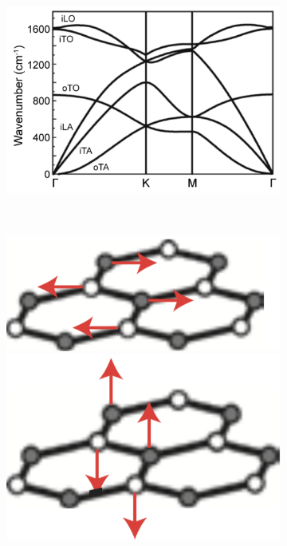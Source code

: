 \begin{figure}[!h]
  \centering
  \begin{subfigure}[t]{0.7\textwidth}
    \caption{}
    \includegraphics[width=\textwidth]{./images/phonon-modes.png}
  \end{subfigure}
  ~
  \begin{subfigure}[t]{0.25\textwidth}
    \centering
    \caption{}
    \includegraphics[width=\textwidth]{./images/g-mode-phonon.png}
    \includegraphics[width=\textwidth]{./images/g-mode-phonon-2.png}

\end{subfigure}
\end{figure}
